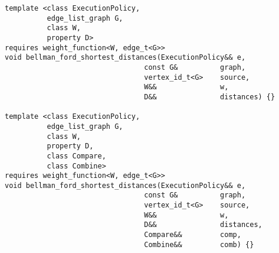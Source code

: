 \begin{lstlisting}
template <class ExecutionPolicy,
          edge_list_graph G,
          class W,
          property D>
requires weight_function<W, edge_t<G>>
void bellman_ford_shortest_distances(ExecutionPolicy&& e,
                                 const G&          graph,
                                 vertex_id_t<G>    source,
                                 W&&               w,
                                 D&&               distances) {}

template <class ExecutionPolicy,
          edge_list_graph G,
          class W,
          property D,
          class Compare,
          class Combine>
requires weight_function<W, edge_t<G>>
void bellman_ford_shortest_distances(ExecutionPolicy&& e,
                                 const G&          graph,
                                 vertex_id_t<G>    source,
                                 W&&               w,
                                 D&&               distances,
                                 Compare&&         comp,
                                 Combine&&         comb) {}
\end{lstlisting}


